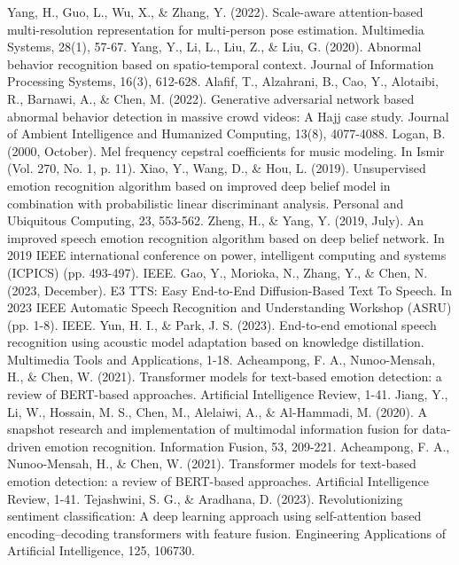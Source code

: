 \documentclass[preprint,12pt]{elsarticle}
\begin{document}
\begin{thebibliography}{99}
 Yang, H., Guo, L., Wu, X., \& Zhang, Y. (2022). Scale-aware attention-based multi-resolution representation for multi-person pose estimation. Multimedia Systems, 28(1), 57-67.
 Yang, Y., Li, L., Liu, Z., \& Liu, G. (2020). Abnormal behavior recognition based on spatio-temporal context. Journal of Information Processing Systems, 16(3), 612-628.
 Alafif, T., Alzahrani, B., Cao, Y., Alotaibi, R., Barnawi, A., \& Chen, M. (2022). Generative adversarial network based abnormal behavior detection in massive crowd videos: A Hajj case study. Journal of Ambient Intelligence and Humanized Computing, 13(8), 4077-4088.
 Logan, B. (2000, October). Mel frequency cepstral coefficients for music modeling. In Ismir (Vol. 270, No. 1, p. 11).
 Xiao, Y., Wang, D., \& Hou, L. (2019). Unsupervised emotion recognition algorithm based on improved deep belief model in combination with probabilistic linear discriminant analysis. Personal and Ubiquitous Computing, 23, 553-562.
 Zheng, H., \& Yang, Y. (2019, July). An improved speech emotion recognition algorithm based on deep belief network. In 2019 IEEE international conference on power, intelligent computing and systems (ICPICS) (pp. 493-497). IEEE.
 Gao, Y., Morioka, N., Zhang, Y., \& Chen, N. (2023, December). E3 TTS: Easy End-to-End Diffusion-Based Text To Speech. In 2023 IEEE Automatic Speech Recognition and Understanding Workshop (ASRU) (pp. 1-8). IEEE.
 Yun, H. I., \& Park, J. S. (2023). End-to-end emotional speech recognition using acoustic model adaptation based on knowledge distillation. Multimedia Tools and Applications, 1-18.
 Acheampong, F. A., Nunoo-Mensah, H., \& Chen, W. (2021). Transformer models for text-based emotion detection: a review of BERT-based approaches. Artificial Intelligence Review, 1-41.
 Jiang, Y., Li, W., Hossain, M. S., Chen, M., Alelaiwi, A., \& Al-Hammadi, M. (2020). A snapshot research and implementation of multimodal information fusion for data-driven emotion recognition. Information Fusion, 53, 209-221.
 Acheampong, F. A., Nunoo-Mensah, H., \& Chen, W. (2021). Transformer models for text-based emotion detection: a review of BERT-based approaches. Artificial Intelligence Review, 1-41.
 Tejashwini, S. G., \& Aradhana, D. (2023). Revolutionizing sentiment classification: A deep learning approach using self-attention based encoding–decoding transformers with feature fusion. Engineering Applications of Artificial Intelligence, 125, 106730.

\end{thebibliography}
\end{document}
